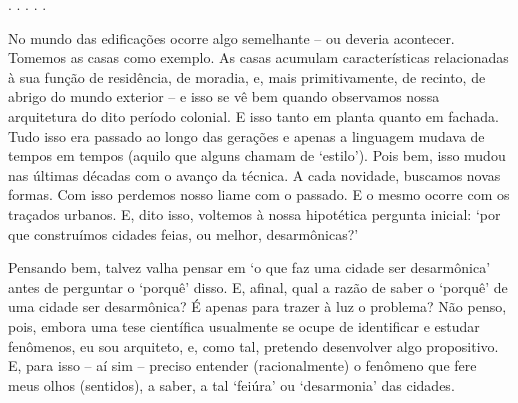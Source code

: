 \documentclass[]{report}
\begin{document}
	\begin{center}
		. . . . .
	\end{center}

	No mundo das edificações ocorre algo semelhante – ou deveria acontecer. Tomemos as casas como exemplo. As casas acumulam características relacionadas à sua função de residência, de moradia, e, mais primitivamente, de recinto, de abrigo do mundo exterior – e isso se vê bem quando observamos nossa arquitetura do dito período colonial. E isso tanto em planta quanto em fachada. Tudo isso era passado ao longo das gerações e apenas a linguagem mudava de tempos em tempos (aquilo que alguns chamam de `estilo'). Pois bem, isso mudou nas últimas décadas com o avanço da técnica. A cada novidade, buscamos novas formas. Com isso perdemos nosso liame com o passado. E o mesmo ocorre com os traçados urbanos. E, dito isso, voltemos à nossa hipotética pergunta inicial: `por que construímos cidades feias, ou melhor, desarmônicas?' 

	
	Pensando bem, talvez valha pensar em `o que faz uma cidade ser desarmônica' antes de perguntar o `porquê' disso. E, afinal, qual a razão de saber o `porquê' de uma cidade ser desarmônica? É apenas para trazer à luz o problema? Não penso, pois, embora uma tese científica usualmente se ocupe de identificar e estudar fenômenos, eu sou arquiteto, e, como tal, pretendo desenvolver algo propositivo. E, para isso – aí sim – preciso entender (racionalmente) o fenômeno que fere meus olhos (sentidos), a saber, a tal `feiúra' ou `desarmonia' das cidades. 
	
\end{document}
